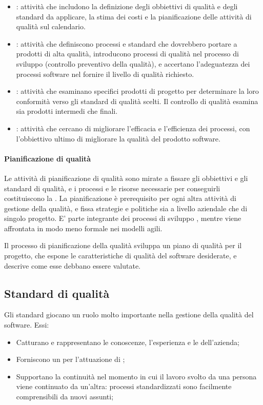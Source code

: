 \begin{itemize}
	\item {}: attività che includono la definizione degli obbiettivi di qualità e degli standard da applicare, la stima dei costi e la pianificazione delle attività di qualità sul calendario.
	\item {}: attività che definiscono processi e standard che dovrebbero portare a prodotti di alta qualità, introducono processi di qualità nel processo di sviluppo (controllo preventivo della qualità), e accertano l'adeguatezza dei processi software nel fornire il livello di qualità richiesto.
	\item {}: attività che esaminano specifici prodotti di progetto per determinare la loro conformità verso gli standard di qualità scelti. Il controllo di qualità esamina sia prodotti intermedi che finali.
	\item {}: attività che cercano di migliorare l'efficacia e l'efficienza dei processi, con l'obbiettivo ultimo di migliorare la qualità del prodotto software.
\end{itemize}

\paragraph{Pianificazione di qualità}
Le attività di pianificazione di qualità sono mirate a fissare gli obbiettivi e gli standard di qualità, e i processi e le risorse necessarie per conseguirli costituiscono la . La pianificazione è prerequisito per ogni altra attività di gestione della qualità, e fissa strategie e politiche sia a livello aziendale che di singolo progetto. E' parte integrante dei processi di sviluppo , mentre viene affrontata in modo meno formale nei modelli agili.

Il processo di pianificazione della qualità sviluppa un piano di qualità per il progetto, che espone le caratteristiche di qualità del software desiderate, e descrive come esse debbano essere valutate.

\subsection{Standard di qualità}
Gli standard giocano un ruolo molto importante nella gestione della qualità del software. Essi:
\begin{itemize}
	\item Catturano e rappresentano le conoscenze, l'esperienza e le  dell'azienda;
	\item Forniscono un  per l'attuazione di ;
	\item Supportano la continuità nel momento in cui il lavoro svolto da una persona viene continuato da un'altra: processi standardizzati sono facilmente comprensibili da nuovi assunti;
\end{itemize}

